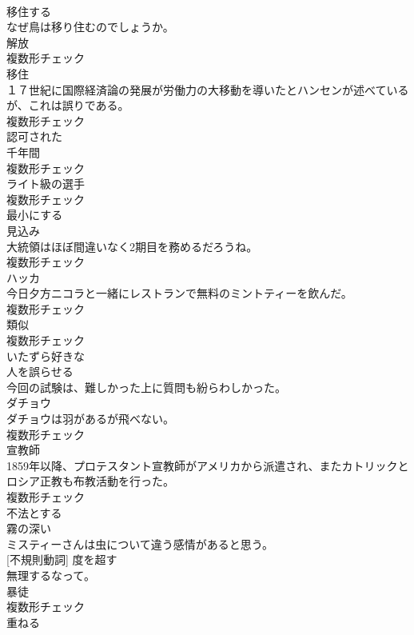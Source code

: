\documentclass[8pt]{extreport}
\begin{document}
\begin{CJK}{UTF8}{min}
\\	[動詞]	移住する	
\\	なぜ鳥は移り住むのでしょうか。	
\\	[名詞]	解放	
\\	複数形チェック
\\	[名詞]	移住	
\\	１７世紀に国際経済論の発展が労働力の大移動を導いたとハンセンが述べているが、これは誤りである。	
\\	複数形チェック
\\	[形容詞]	認可された	
\\	[名詞]	千年間	
\\	複数形チェック
\\	[名詞]	ライト級の選手	
\\	複数形チェック
\\	[動詞]	最小にする	
\\	[名詞]	見込み	
\\	大統領はほぼ間違いなく2期目を務めるだろうね。	
\\	複数形チェック
\\	[名詞]	ハッカ	
\\	今日夕方ニコラと一緒にレストランで無料のミントティーを飲んだ。	
\\	複数形チェック
\\	[名詞]	類似	
\\	複数形チェック
\\	[形容詞]	いたずら好きな	
\\	[形容詞]	人を誤らせる	
\\	今回の試験は、難しかった上に質問も紛らわしかった。	
\\	[名詞]	ダチョウ	
\\	ダチョウは羽があるが飛べない。	
\\	複数形チェック
\\	[名詞]	宣教師	
\\	1859年以降、プロテスタント宣教師がアメリカから派遣され、またカトリックとロシア正教も布教活動を行った。	
\\	複数形チェック
\\	[動詞]	不法とする	
\\	[形容詞]	霧の深い	
\\	ミスティーさんは虫について違う感情があると思う。	
\\	[動詞] [不規則動詞]	度を超す	
\\	無理するなって。	
\\	[名詞]	暴徒	
\\	複数形チェック
\\	[動詞]	重ねる	

\end{CJK}
\end{document}
